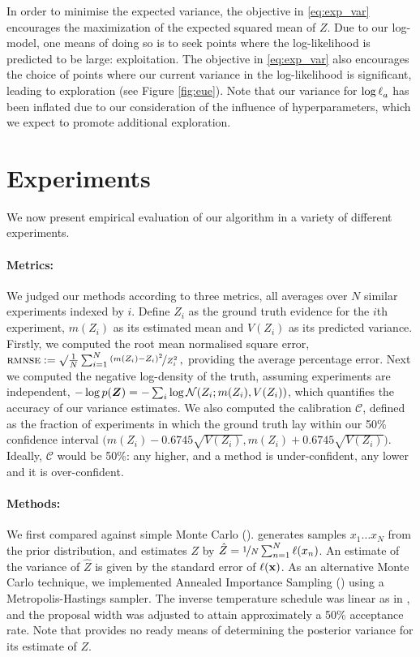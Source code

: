 \documentclass{article}
\begin{document}
In order to minimise the expected variance, the objective in \eqref{eq:exp_var} encourages the maximization of the expected squared mean of $Z$. Due to our log-\gpb model, one means of doing so is to seek points where the log-likelihood is predicted to be large: exploitation.  The objective in \eqref{eq:exp_var} also encourages the choice of points where our current variance in the log-likelihood is significant, leading to exploration (see Figure \ref{fig:eue}). Note that our variance for $\tr_a$ has been inflated due to our consideration of the influence of hyperparameters, which we expect to promote additional exploration.

\section{Experiments}
\label{sec:experiments}



We now present empirical evaluation of our algorithm in a variety of different experiments.

\paragraph{Metrics:} We judged our methods according to three metrics, all averages over $N$ similar experiments indexed by $i$. Define $Z_i$ as the ground truth evidence for the $i$th experiment, $m(Z_i)$ as its estimated mean  and $V(Z_i)$  as its predicted variance. Firstly, we computed the root mean normalised square error,
$
\acro{rmnse} 
\deq \surd\frac{1}{N} \sum_{i=1}^{N} \nicefrac{(m(Z_i) - Z_i)^2}{Z_i^2}\,,
$
providing the average percentage error. Next we computed the negative log-density of the truth, assuming experiments are independent,
$
-\log p(\vect{Z}) = -\sum_i \log \N{Z_i}{m(Z_i)}{V(Z_i)}
$, which quantifies the accuracy of our variance estimates. We also computed the calibration $\mathcal{C}$, defined as the fraction of experiments in which the ground truth lay within our 50\% confidence interval $\bigl(m(Z_i) - 0.6745 \surd{V(Z_i)}, m(Z_i) + 0.6745 \surd{V(Z_i)}\bigr)$. Ideally, $\mathcal{C}$ would be  50\%: any higher, and a method is under-confident, any lower and it is over-confident. 

\paragraph{Methods:} We first compared against simple Monte Carlo ().  generates samples $x_1 \dots x_N$ from the prior distribution, and estimates $Z$ by $\hat{Z} = \nicefrac{1}{N} \sum_{n=1}^{N} \lfn(x_n)$.  An estimate of the variance of $\hat{Z}$ is given by the standard error of $\lfn({\bf x})$. As an alternative Monte Carlo technique, we implemented Annealed Importance Sampling () using a Metropolis-Hastings sampler.  The inverse temperature schedule was linear as in \citet{BZMonteCarlo}, and the proposal width was adjusted to attain approximately a 50\% acceptance rate. Note that  provides no ready means of determining the posterior variance for its  estimate of $Z$.  
\end{document}
